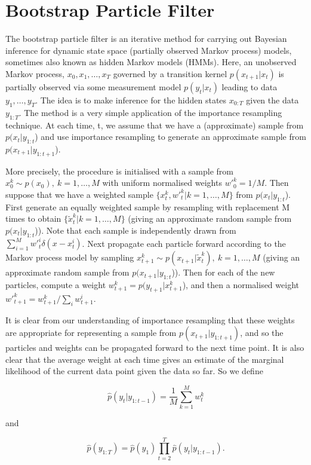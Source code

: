 \documentclass[11pt,a4,twosided,singlespacing,titlepagenumber=on]{scrreprt}
\numberwithin{equation}{chapter} %
\theoremstyle{remark}
\begin{document}
\section{Bootstrap Particle Filter}

The bootstrap particle filter is an iterative method for carrying out Bayesian inference for dynamic state space (partially observed Markov process) models, sometimes also known as hidden Markov models (HMMs). Here, an unobserved Markov process, $x_0,x_1,\ldots,x_T$ governed by a transition kernel $p(x_{t+1}|x_t)$ is partially observed via some measurement model $p(y_t|x_t)$ leading to data $y_1,\ldots,y_T$. The idea is to make inference for the hidden states $x_{0:T}$ given the data $y_{1:T}$. The method is a very simple application of the importance resampling technique. At each time, t, we assume that we have a (approximate) sample from $p(x_t|y_{1:t}$) and use importance resampling to generate an approximate sample from $p(x_{t+1}|y_{1:t+1}$).

More precisely, the procedure is initialised with a sample from $x_0^k \sim p(x_0),\ k=1,\ldots,M$ with uniform normalised weights ${w'}_0^k=1/M$. Then suppose that we have a weighted sample $\{x_t^k,{w'}_t^k|k=1,\ldots,M\}$ from $p(x_t|y_{1:t}$). First generate an equally weighted sample by resampling with replacement M times to obtain $\{\tilde{x}_t^k|k=1,\ldots,M\}$ (giving an approximate random sample from $p(x_t|y_{1:t}$)). Note that each sample is independently drawn from $\sum_{i=1}^M {w'}_t^i\delta(x-x_t^i)$. Next propagate each particle forward according to the Markov process model by sampling $x_{t+1}^k\sim p(x_{t+1}|\tilde{x}_t^k),\ k=1,\ldots,M$ (giving an approximate random sample from $p(x_{t+1}|y_{1:t}$)). Then for each of the new particles, compute a weight $w_{t+1}^k=p(y_{t+1}|x_{t+1}^k$), and then a normalised weight ${w'}_{t+1}^k=w_{t+1}^k/\sum_i w_{t+1}^i$.

It is clear from our understanding of importance resampling that these weights are appropriate for representing a sample from $p(x_{t+1}|y_{1:t+1})$, and so the particles and weights can be propagated forward to the next time point. It is also clear that the average weight at each time gives an estimate of the marginal likelihood of the current data point given the data so far. So we define

$$\displaystyle \hat{p}(y_t|y_{1:t-1})=\frac{1}{M}\sum_{k=1}^M w_t^k$$

and

$$\displaystyle \hat{p}(y_{1:T}) = \hat{p}(y_1)\prod_{t=2}^T \hat{p}(y_t|y_{1:t-1}).$$
\end{document}

